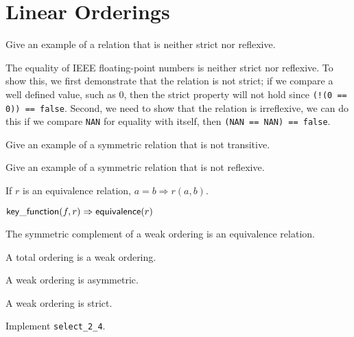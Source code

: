 \chapter{Linear Orderings}

\begin{exercise}
	Give an example of a relation that is neither strict nor reflexive.
\end{exercise}

\begin{solution}
	The equality of IEEE floating-point numbers is neither strict nor reflexive. To show this, we first
	demonstrate that the relation is not strict; if we compare a well defined value, such as 0, then
	the strict property will not hold since \verb|(!(0 == 0)) == false|. Second, we need to show that
	the relation is irreflexive, we can do this if we compare \verb|NAN| for equality with itself, then
	\verb|(NAN == NAN) == false|.

	
\end{solution}

\begin{exercise}
	Give an example of a symmetric relation that is not transitive.
\end{exercise}

\begin{exercise}
	Give an example of a symmetric relation that is not reflexive.
\end{exercise}

\begin{lemma}
	If $r$ is an equivalence relation, $a = b \Rightarrow r(a, b)$.
\end{lemma}

\begin{lemma}
	$\mathsf{key\_function}(f, r) \Rightarrow \mathsf{equivalence}(r)$
\end{lemma}

\begin{lemma}
	The symmetric complement of a weak ordering is an equivalence relation.
\end{lemma}

\begin{lemma}
	A total ordering is a weak ordering.
\end{lemma}

\begin{lemma}
	A weak ordering is asymmetric.
\end{lemma}

\begin{lemma}
	A weak ordering is strict.
\end{lemma}

\begin{exercise}
	Implement \verb|select_2_4|.
\end{exercise}
